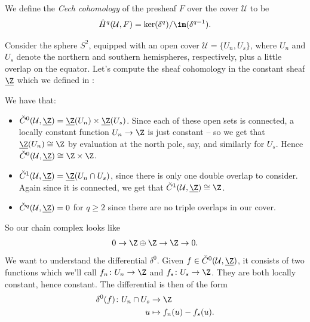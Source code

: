\documentclass[11pt]{amsart}
\begin{document}
\begin{definition}\label{def:Cech-cohomology-on-cover} 
We define the \textit{Cech cohomology} of the presheaf $F$ over the cover $\mathcal{U}$ to be
\begin{align*}
    \hat{H}^q(\mathcal{U},F) = \ker(\delta^q)/\im(\delta^{q-1}).
\end{align*}
\end{definition}

\begin{example}\label{exa:s2-north-south-cover}
Consider the sphere $S^2$, equipped with an open cover $\mathcal{U} = \{U_n,U_s\}$, where $U_n$ and $U_s$ denote the northern and southern hemispheres, respectively, plus a little overlap on the equator. Let's compute the sheaf cohomology in the constant sheaf $\underline{\Z}$ which we defined in :
\begin{center} 

\end{center}
We have that:
\begin{itemize}
    \item $\check{C}^0(\mathcal{U},\underline{\Z}) = \underline{\Z}(U_n) \times \underline{\Z}(U_s)$. Since each of these open sets is connected, a locally constant function $U_n \to \Z$ is just constant -- so we get that $\underline{\Z}(U_n) \cong \Z$ by evaluation at the north pole, say, and similarly for $U_s$. Hence $\check{C}^0(\mathcal{U},\underline{\Z}) \cong \Z \times \Z$.
    \item $\check{C}^1(\mathcal{U},\underline{\Z}) = \underline{\Z}(U_n \cap U_s)$, since there is only one double overlap to consider. Again since it is connected, we get that $\check{C}^1(\mathcal{U},\underline{\Z})\cong \Z$.
    \item $\check{C}^q(\mathcal{U},\underline{\Z}) = 0$ for $q\ge2$ since there are no triple overlaps in our cover.
\end{itemize}
So our chain complex looks like
\begin{align*}
    0 \to \Z \oplus \Z \to \Z \to 0.
\end{align*}
We want to understand the differential $\delta^0$. Given $f\in \check{C}^0(\mathcal{U}, \underline{\Z})$, it consists of two functions which we'll call $f_n \colon U_n \to \Z$ and $f_s \colon U_s \to \Z$. They are both locally constant, hence constant. The differential is then of the form
\begin{align*}
    \delta^0(f) \colon U_n \cap U_s &\to \Z \\
    u &\mapsto f_n(u)-f_s(u).

\end{align*}
\end{example}
\end{document}

